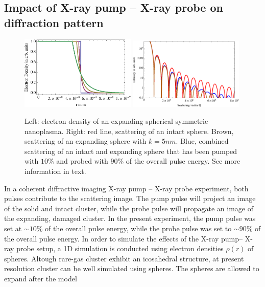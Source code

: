 \subsection{Impact of X-ray pump -- X-ray probe on diffraction pattern}
\begin{figure}
	\centering
		\includegraphics[width=0.49\textwidth]{images/electron-density-convoluted-object.eps}
		\includegraphics[width=0.49\textwidth]{images/beam-convoluted-with-object.eps}
	\caption[Influence of X-ray pump-- X-ray probe study in diffraction image.]{Left: electron density of an expanding spherical symmetric nanoplasma. Right: red line, scattering of an intact sphere. Brown, scattering of an expanding sphere with $k=5nm$. Blue, combined scattering of an intact and expanding sphere that has been pumped with $10\%$ and probed with $90\%$ of the overall pulse energy. See more information in text.}
	\label{fig:electron-density-convoluted-object}
\end{figure}
In a coherent diffractive imaging X-ray pump -- X-ray probe experiment, both pulses contribute to the scattering image. The pump pulse will project an image of the solid and intact cluster, while the probe pulse will propagate an image of the expanding, damaged cluster. In the present experiment, the pump pulse was set at $\sim10\%$ of the overall pulse energy, while the probe pulse was set to $\sim90\%$ of the overall pulse energy. In order to simulate the effects of the X-ray pump-- X-ray probe setup, a 1D simulation is conducted using electron densities $\rho\left(r\right)$ of spheres. Altough rare-gas cluster exhibit an icosahedral structure, at present resolution cluster can be well simulated using spheres. The spheres are allowed to expand after the model
